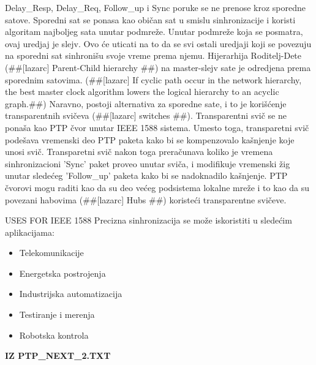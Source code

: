 \documentclass[a4paper,12pt, master]{etf}
\begin{document}
	Delay\_Resp, Delay\_Req, Follow\_up i Sync poruke se ne prenose kroz sporedne satove. 
	Sporedni sat se ponasa kao obi\v{c}an sat u smislu sinhronizacije i koristi algoritam 
	najboljeg sata unutar podmre\v{z}e. Unutar podmre\v{z}e koja se posmatra, ovaj uredjaj je slejv. 
	Ovo \'{c}e uticati na to da se svi ostali uredjaji koji se povezuju na sporedni sat 
	sinhroni\v{s}u svoje vreme prema njemu. Hijerarhija Roditelj-Dete (\#\#[lazarc] Parent-Child 
	hierarchy \#\#) na master-slejv sate je odredjena prema sporednim satovima. (\#\#[lazarc] 
	If cyclic path occur in the network hierarchy, the best master clock algorithm lowers the 
	logical hierarchy to an acyclic graph.\#\#)	Naravno, postoji alternativa za sporedne sate, 
	i to je kori\v{s}\'{c}enje transparentnih svi\v{c}eva (\#\#[lazarc] switches \#\#). Transparentni svi\v{c}
	se ne pona\v{s}a kao PTP \v{c}vor unutar IEEE 1588 sistema. Umesto toga, transparetni svi\v{c} pode\v{s}ava 
	vremenski deo PTP paketa kako bi se kompenzovalo ka\v{s}njenje koje unosi svi\v{c}. Transparetni 
	svi\v{c} nakon toga prera\v{c}unava koliko je vremena sinhronizacioni 'Sync' paket proveo unutar 
	svi\v{c}a, i modifikuje vremenski \v{z}ig unutar slede\'{c}eg 'Follow\_up' paketa kako bi se 
	nadoknadilo ka\v{s}njenje. PTP \v{c}vorovi mogu raditi kao da su deo ve\'{c}eg podsistema lokalne mre\v{z}e
	i to kao da su povezani habovima (\#\#[lazarc] Hubs \#\#) koriste\'{c}i transparentne svi\v{c}eve.
	
	USES FOR IEEE 1588
	Precizna sinhronizacija se mo\v{z}e iskoristiti u slede\'{c}im aplikacijama:
	\begin{itemize}
		\item Telekomunikacije
		\item Energetska postrojenja
		\item Industrijska automatizacija
		\item Testiranje i merenja
		\item Robotska kontrola
	\end{itemize}

	\textbf{IZ PTP\_NEXT\_2.TXT}
\end{document}
